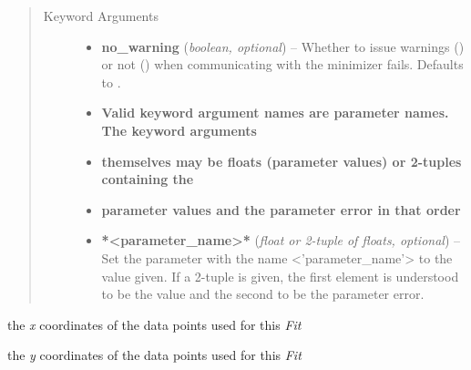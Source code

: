 \documentclass[a4paper,10pt,english]{sphinxmanual}
\begin{document}
\begin{fulllineitems}
\begin{fulllineitems}
\begin{quote}
\begin{description}
\begin{itemize}
\end{itemize}

\item[{Keyword Arguments}] \leavevmode\begin{itemize}
\item {} 
\textbf{no\_warning} (\emph{boolean, optional}) --
Whether to issue warnings () or not () when
communicating with the minimizer fails. Defaults to .

\item {} 
\textbf{Valid keyword argument names are parameter names. The keyword arguments}

\item {} 
\textbf{themselves may be floats (parameter values) or 2-tuples containing the}

\item {} 
\textbf{parameter values and the parameter error in that order}

\item {} 
\textbf{*\textless{}parameter\_name\textgreater{}*} (\emph{float or 2-tuple of floats, optional}) --
Set the parameter with the name \textless{}'parameter\_name'\textgreater{} to the value
given. If a 2-tuple is given, the first element is understood
to be the value and the second to be the parameter error.

\end{itemize}

\end{description}\end{quote}

\end{fulllineitems}


\begin{fulllineitems}
\label{index:kafe.fit.Fit.xdata}
the \emph{x} coordinates of the data points used for this \emph{Fit}

\end{fulllineitems}


\begin{fulllineitems}
\label{index:kafe.fit.Fit.ydata}
the \emph{y} coordinates of the data points used for this \emph{Fit}

\end{fulllineitems}


\end{fulllineitems}
\end{document}
